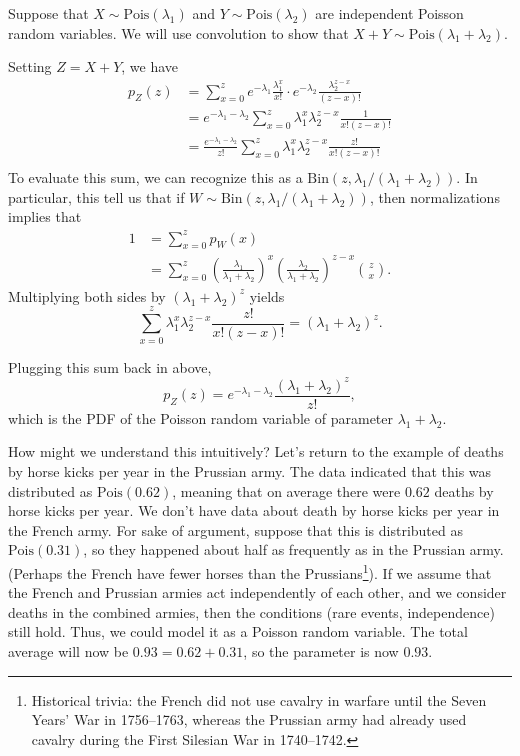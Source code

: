 \documentclass{ximera}
\begin{document}
\begin{example}
Suppose that $X \sim \text{Pois}(\lambda_1)$ and $Y \sim \text{Pois}(\lambda_2)$ are independent Poisson random variables. We will use convolution to show that $X+Y \sim \text{Pois}(\lambda_1 + \lambda_2)$.

Setting $Z=X+Y$, we have
\begin{align*}
p_Z(z) &= \sum_{x=0}^z e^{-\lambda_1} \frac{\lambda_1^x}{x!} \cdot e^{-\lambda_2} \frac{\lambda_2^{z-x}}{(z-x)!}\\
&= e^{-\lambda_1 - \lambda_2}\sum_{x=0}^z \lambda_1^x \lambda_2^{z-x} \frac{1}{x! (z-x)!}\\
&=  \frac{e^{-\lambda_1 - \lambda_2}}{z!}\sum_{x=0}^z \lambda_1^x \lambda_2^{z-x} \frac{z!}{x! (z-x)!}\\
\end{align*}
To evaluate this sum, we can recognize this as a $\textrm{Bin}(z,\lambda_1/(\lambda_1 + \lambda_2))$. In particular, this tell us that if $W \sim \textrm{Bin}(z,\lambda_1/(\lambda_1 + \lambda_2))$, then normalizations implies that
\begin{align*}
1 &= \sum_{x=0}^z p_W(x) \\
&= \sum_{x=0}^z \left(\frac{\lambda_1}{\lambda_1 + \lambda_2}\right)^x \left( \frac{\lambda_2}{\lambda_1 + \lambda_2}\right)^{z-x} \binom{z}{x} .
\end{align*}
Multiplying both sides by $(\lambda_1 + \lambda_2)^z$ yields
$$
\sum_{x=0}^z \lambda_1^x \lambda_2^{z-x} \frac{z!}{x! (z-x)!} = (\lambda_1 + \lambda_2)^z.
$$

Plugging this sum back in above,
$$
p_Z(z) = e^{-\lambda_1 - \lambda_2} \frac{(\lambda_1+ \lambda_2)^z}{z!},
$$
which is the PDF of the Poisson random variable of parameter $\lambda_1 + \lambda_2$.

How might we understand this intuitively? Let's return to the example of deaths by horse kicks per year in the Prussian army. The data indicated that this was distributed as $\mathrm{Pois}(0.62)$, meaning that on average there were $0.62$ deaths by horse kicks per year. We don't have data about death by horse kicks per year in the French army. For sake of argument, suppose that this is distributed as $\mathrm{Pois}(0.31)$, so they happened about half as frequently as in the Prussian army. (Perhaps the French have fewer horses than the Prussians\footnote{Historical trivia: the French did not use cavalry in warfare until the Seven Years' War in 1756--1763, whereas the Prussian army had already used cavalry during the First Silesian War in 1740--1742.}). If we assume that the French and Prussian armies act independently of each other, and we consider deaths in the combined armies, then the conditions (rare events, independence) still hold. Thus, we could model it as a Poisson random variable. The total average will now be $0.93=0.62+0.31$, so the parameter is now $0.93$.


\end{example}
\end{document}
